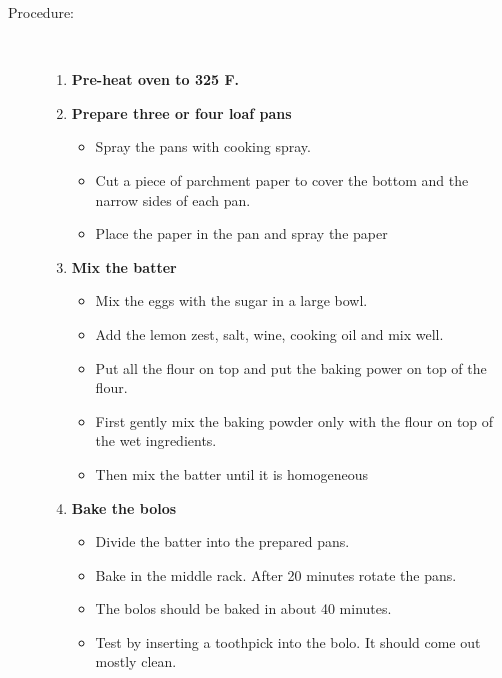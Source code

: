 \documentclass[11pt,letterpaper]{article}
\begin{document}
\begin{description}
\item[Procedure:]\ \\
	\begin{enumerate}
	\item {\bf Pre-heat oven to 325 F.}
	\item {\bf Prepare three or four loaf pans}
	\begin{itemize}
	\item Spray the pans with cooking spray.
	\item Cut a piece of parchment paper to cover the bottom and the narrow sides of each pan.
	\item Place the paper in the pan and spray the paper
	 \end{itemize}
	\item {\bf Mix the batter}
	\begin{itemize}
	\item Mix the eggs with the sugar in a large bowl.
	 \item Add the lemon zest, salt, wine, cooking oil and mix well.
	 \item Put all the flour on top and put the baking power on top of the flour.
	 \item First gently mix the baking powder only with the flour on top of the wet ingredients.
	 \item Then mix the batter until it is homogeneous
	\end{itemize}
	\item {\bf Bake the bolos}
	\begin{itemize}
        		\item Divide the batter into the prepared pans.
		\item Bake in the middle rack. After 20 minutes rotate the pans.
		\item The bolos should be baked in about 40 minutes.
		\item Test by inserting a toothpick into the bolo. It should come out mostly clean.
	\end{itemize}
        

\end{enumerate}
\end{description}
\end{document}
